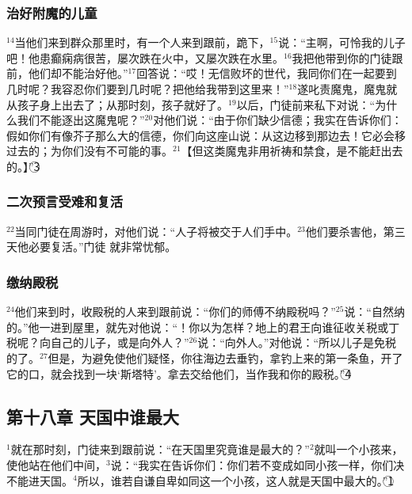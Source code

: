 \subsubsection{治好附魔的儿童}
$^{14}$当他们来到群众那里时，有一个人来到\UL[耶稣]跟前，跪下，$^{15}$说：“主啊，可怜我的儿子吧！他患癫痫病很苦，屡次跌在火中，又屡次跌在水里。$^{16}$我把他带到你的门徒跟前，他们却不能治好他。”$^{17}$\UL[耶稣]回答说：“哎！无信败坏的世代，我同你们在一起要到几时呢？我容忍你们要到几时呢？把他给我带到这里来！”$^{18}$\UL[耶稣]遂叱责魔鬼，魔鬼就从孩子身上出去了；从那时刻，孩子就好了。$^{19}$以后，门徒前来私下对\UL[耶稣]说：“为什么我们不能逐出这魔鬼呢？”$^{20}$\UL[耶稣]对他们说：“由于你们缺少信德；我实在告诉你们：假如你们有像芥子那么大的信德，你们向这座山说：从这边移到那边去！它必会移过去的；为你们没有不可能的事。$^{21}$【但这类魔鬼非用祈祷和禁食，是不能赶出去的。】”\textcircled{3}


\subsubsection{二次预言受难和复活}
$^{22}$当\UL[耶稣]同门徒在\UL[加里肋亚]周游时，\UL[耶稣]对他们说：“人子将被交于人们手中。$^{23}$他们要杀害他，第三天他必要复活。”门徒 就非常忧郁。


\subsubsection{缴纳殿税}
$^{24}$他们来到\UL[葛法翁]时，收殿税的人来到\UL[伯多禄]跟前说：“你们的师傅不纳殿税吗？”$^{25}$\UL[伯多禄]说：“自然纳的。”他一进到屋里，\UL[耶稣]就先对他说：“\UL[西满]！你以为怎样？地上的君王向谁征收关税或丁税呢？向自己的儿子，或是向外人？”$^{26}$\UL[伯多禄]说：“向外人。”\UL[耶稣]对他说：“所以儿子是免税的了。$^{27}$但是，为避免使他们疑怪，你往海边去垂钓，拿钓上来的第一条鱼，开了它的口，就会找到一块‘斯塔特’。拿去交给他们，当作我和你的殿税。”\textcircled{4}


\subsection{第十八章 天国中谁最大}
$^{1}$就在那时刻，门徒来到\UL[耶稣]跟前说：“在天国里究竟谁是最大的？”$^{2}$\UL[耶稣]就叫一个小孩来，使他站在他们中间，$^{3}$说：“我实在告诉你们：你们若不变成如同小孩一样，你们决不能进天国。$^{4}$所以，谁若自谦自卑如同这一个小孩，这人就是天国中最大的。”\textcircled{1}


